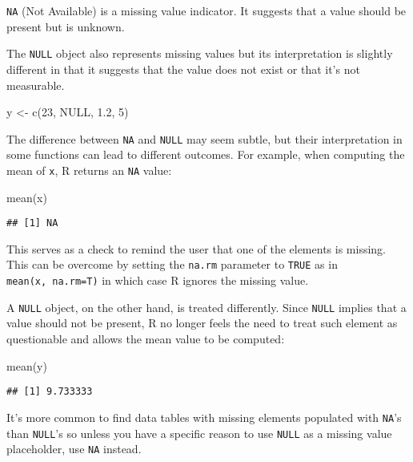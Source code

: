\documentclass[
]{article}
\newenvironment{Shaded}{\begin{snugshade}}{\end{snugshade}}
\newcommand{\ConstantTok}[1]{\textcolor[rgb]{0.00,0.00,0.00}{#1}}
\newcommand{\DecValTok}[1]{\textcolor[rgb]{0.00,0.00,0.81}{#1}}
\newcommand{\FloatTok}[1]{\textcolor[rgb]{0.00,0.00,0.81}{#1}}
\newcommand{\FunctionTok}[1]{\textcolor[rgb]{0.00,0.00,0.00}{#1}}
\newcommand{\NormalTok}[1]{#1}
\newcommand{\OtherTok}[1]{\textcolor[rgb]{0.56,0.35,0.01}{#1}}
\begin{document}
\texttt{NA} (Not Available) is a missing value indicator. It suggests
that a value should be present but is unknown.

The \texttt{NULL} object also represents missing values but its
interpretation is slightly different in that it suggests that the value
does not exist or that it's not measurable.

\begin{Shaded}
\begin{Highlighting}[]
\NormalTok{y }\OtherTok{\textless{}{-}} \FunctionTok{c}\NormalTok{(}\DecValTok{23}\NormalTok{, }\ConstantTok{NULL}\NormalTok{, }\FloatTok{1.2}\NormalTok{, }\DecValTok{5}\NormalTok{)}
\end{Highlighting}
\end{Shaded}

The difference between \texttt{NA} and \texttt{NULL} may seem subtle,
but their interpretation in some functions can lead to different
outcomes. For example, when computing the mean of \texttt{x}, R returns
an \texttt{NA} value:

\begin{Shaded}
\begin{Highlighting}[]
\FunctionTok{mean}\NormalTok{(x)}
\end{Highlighting}
\end{Shaded}

\begin{verbatim}
## [1] NA
\end{verbatim}

This serves as a check to remind the user that one of the elements is
missing. This can be overcome by setting the \texttt{na.rm} parameter to
\texttt{TRUE} as in \texttt{mean(x,\ na.rm=T)} in which case R ignores
the missing value.

A \texttt{NULL} object, on the other hand, is treated differently. Since
\texttt{NULL} implies that a value should not be present, R no longer
feels the need to treat such element as questionable and allows the mean
value to be computed:

\begin{Shaded}
\begin{Highlighting}[]
\FunctionTok{mean}\NormalTok{(y)}
\end{Highlighting}
\end{Shaded}

\begin{verbatim}
## [1] 9.733333
\end{verbatim}

It's more common to find data tables with missing elements populated
with \texttt{NA}'s than \texttt{NULL}'s so unless you have a specific
reason to use \texttt{NULL} as a missing value placeholder, use
\texttt{NA} instead.
\end{document}

